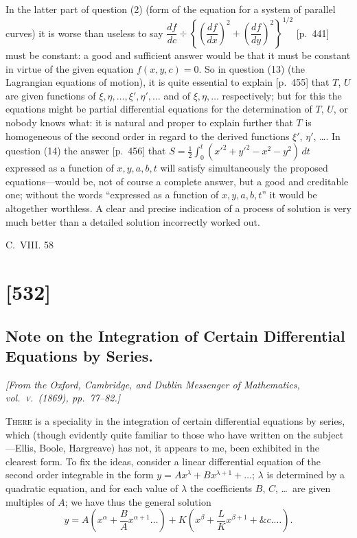 \documentclass[11pt,a4paper]{article}
\theoremstyle{plain}
\theoremstyle{definition}
\begin{document}
In the latter part of question (2) (form of the equation for a system of parallel
curves) it is worse than useless to say
$\dfrac{df}{dc}\div\left\{\left(\dfrac{df}{dx}\right)^2+\left(\dfrac{df}{dy}\right)^2\right\}^{1/2}$
[p.~441] must be constant:
a good and sufficient answer would be that it must be constant in virtue of the given
equation $f(x,y,c)=0$. So in question (13) (the Lagrangian equations of motion), it is
quite essential to explain [p.~455] that $T$, $U$ are given functions of
$\xi,\eta,\ldots,\xi',\eta',\ldots$ and of $\xi,\eta,\ldots$ respectively; but for this the equations
might be partial differential equations for the determination of $T$, $U$, or nobody knows what:
it is natural and proper to explain further that $T$ is homogeneous of the second order in
regard to the derived functions $\xi'$, $\eta'$, \ldots. In question (14) the answer [p.~456] that
$S=\frac12\int_0^t(x'^2+y'^2-x^2-y^2)\,dt$ expressed as a function of $x,y,a,b,t$ will satisfy
simultaneously the proposed equations---would be, not of course a complete answer, but a
good and creditable one; without the words ``expressed as a function of $x,y,a,b,t$'' it would
be altogether worthless. A clear and precise indication of a process of solution is very much better than a
detailed solution incorrectly worked out.

\hfill C.\ VIII.\hspace{2em} 58

\clearpage

\section{[532]}
\subsection{Note on the Integration of Certain Differential Equations by Series.}

\begin{center}
\textit{[From the Oxford, Cambridge, and Dublin Messenger of Mathematics, vol.~\textsc{v}.\ (1869), pp.~77--82.]}
\end{center}

\textsc{There} is a speciality in the integration of certain differential equations by
series, which (though evidently quite familiar to those who have written on the
subject---Ellis, Boole, Hargreave) has not, it appears to me, been exhibited in the
clearest form. To fix the ideas, consider a linear differential equation of the second
order integrable in the form $y=Ax^\lambda+Bx^{\lambda+1}+\ldots$; $\lambda$ is determined by a quadratic
equation, and for each value of $\lambda$ the coefficients $B$, $C$, \ldots\ are given multiples of $A$;
we have thus the general solution
\[
y=A\left(x^\alpha+\frac{B}{A}x^{\alpha+1}\ldots\right)
+K\left(x^\beta+\frac{L}{K}x^{\beta+1}+\&c.\ldots\right).
\]
\end{document}

